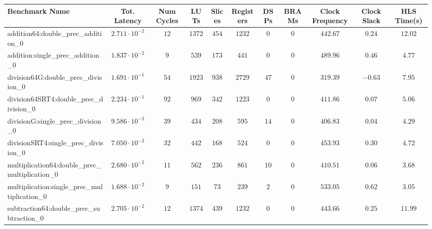 \begin{tabular}{|l|c|c|c|c|c|c|c|c|c|c|}
\hline
Benchmark Name                                   & Tot. Latency            & Num Cycles & LUTs     & Slices   & Registers & DSPs   & BRAMs & Clock Frequency & Clock Slack & HLS Time(s) \\
\hline
addition64:double\_prec\_addition\_0             & $ 2.711 \cdot 10^{-2} $ & $ 12     $ & $ 1372 $ & $ 454  $ & $ 1232  $ & $ 0  $ & $ 0 $ & $ 442.67      $ & $ 0.24    $ & $ 12.02   $ \\
addition:single\_prec\_addition\_0               & $ 1.837 \cdot 10^{-2} $ & $ 9      $ & $ 539  $ & $ 173  $ & $ 441   $ & $ 0  $ & $ 0 $ & $ 489.96      $ & $ 0.46    $ & $ 4.77    $ \\
division64G:double\_prec\_division\_0            & $ 1.691 \cdot 10^{-1} $ & $ 54     $ & $ 1923 $ & $ 938  $ & $ 2729  $ & $ 47 $ & $ 0 $ & $ 319.39      $ & $ -0.63   $ & $ 7.95    $ \\
division64SRT4:double\_prec\_division\_0         & $ 2.234 \cdot 10^{-1} $ & $ 92     $ & $ 969  $ & $ 342  $ & $ 1223  $ & $ 0  $ & $ 0 $ & $ 411.86      $ & $ 0.07    $ & $ 5.06    $ \\
divisionG:single\_prec\_division\_0              & $ 9.586 \cdot 10^{-2} $ & $ 39     $ & $ 434  $ & $ 208  $ & $ 595   $ & $ 14 $ & $ 0 $ & $ 406.83      $ & $ 0.04    $ & $ 4.29    $ \\
divisionSRT4:single\_prec\_division\_0           & $ 7.050 \cdot 10^{-2} $ & $ 32     $ & $ 442  $ & $ 168  $ & $ 524   $ & $ 0  $ & $ 0 $ & $ 453.93      $ & $ 0.30    $ & $ 4.72    $ \\
multiplication64:double\_prec\_multiplication\_0 & $ 2.680 \cdot 10^{-2} $ & $ 11     $ & $ 562  $ & $ 236  $ & $ 861   $ & $ 10 $ & $ 0 $ & $ 410.51      $ & $ 0.06    $ & $ 3.68    $ \\
multiplication:single\_prec\_multiplication\_0   & $ 1.688 \cdot 10^{-2} $ & $ 9      $ & $ 151  $ & $ 73   $ & $ 239   $ & $ 2  $ & $ 0 $ & $ 533.05      $ & $ 0.62    $ & $ 3.05    $ \\
subtraction64:double\_prec\_subtraction\_0       & $ 2.705 \cdot 10^{-2} $ & $ 12     $ & $ 1374 $ & $ 439  $ & $ 1232  $ & $ 0  $ & $ 0 $ & $ 443.66      $ & $ 0.25    $ & $ 11.99   $ \\

\end{tabular}
